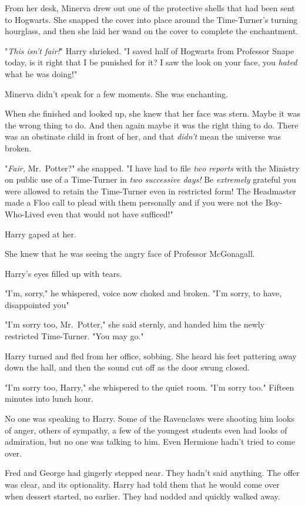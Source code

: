 From her desk, Minerva drew out one of the protective shells that had been sent
to Hogwarts. She snapped the cover into place around the Time-Turner's turning
hourglass, and then she laid her wand on the cover to complete the enchantment.

"\emph{This isn't fair!}" Harry shrieked. "I saved half of Hogwarts from
Professor Snape today, is it right that I be punished for it? I saw the look on
your face, you \emph{hated} what he was doing!"

Minerva didn't speak for a few moments. She was enchanting.

When she finished and looked up, she knew that her face was stern. Maybe it was
the wrong thing to do. And then again maybe it was the right thing to do. There
was an obstinate child in front of her, and that \emph{didn't} mean the
universe was broken.

"\emph{Fair,} Mr.~Potter?" she snapped. "I have had to file \emph{two reports}
with the Ministry on public use of a Time-Turner in \emph{two successive days!}
Be \emph{extremely} grateful you were allowed to retain the Time-Turner even in
restricted form! The Headmaster made a Floo call to plead with them personally
and if you were not the Boy-Who-Lived even that would not have sufficed!"

Harry gaped at her.

She knew that he was seeing the angry face of Professor McGonagall.

Harry's eyes filled up with tears.

"I'm, sorry," he whispered, voice now choked and broken. "I'm sorry, to have,
disappointed you{\el}"

"I'm sorry too, Mr.~Potter," she said sternly, and handed him the newly
restricted Time-Turner. "You may go."

Harry turned and fled from her office, sobbing. She heard his feet pattering
away down the hall, and then the sound cut off as the door swung closed.

"I'm sorry too, Harry," she whispered to the quiet room. "I'm sorry too."
\sbreak
Fifteen minutes into lunch hour.

No one was speaking to Harry. Some of the Ravenclaws were shooting him looks of
anger, others of sympathy, a few of the youngest students even had looks of
admiration, but no one was talking to him. Even Hermione hadn't tried to come
over.

Fred and George had gingerly stepped near. They hadn't said anything. The offer
was clear, and its optionality. Harry had told them that he would come over
when dessert started, no earlier. They had nodded and quickly walked away.

